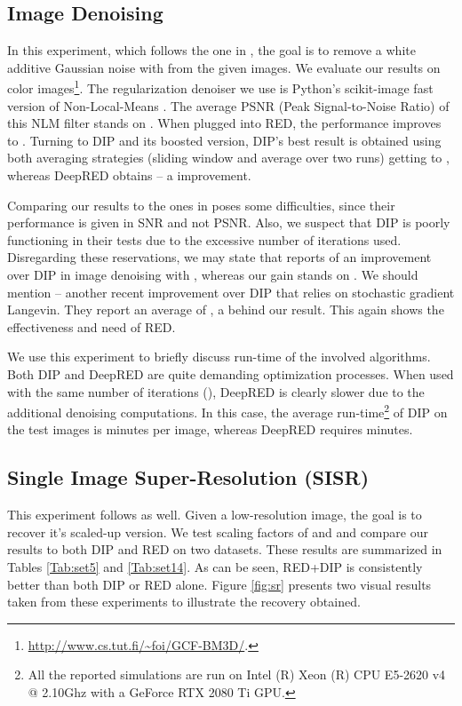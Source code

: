 \documentclass[12pt]{article}
\begin{document}
\subsection{Image Denoising}

In this experiment, which follows the one in \cite{DIP-2018}, the goal is to remove a white additive Gaussian noise with  from the given images. We evaluate our results on  color images\footnote{ \url{http://www.cs.tut.fi/~foi/GCF-BM3D/}.}. The regularization denoiser we use is Python's \textsf{scikit-image} fast version of Non-Local-Means \cite{NLM}. The average PSNR (Peak Signal-to-Noise Ratio) of this NLM filter stands on . When plugged into RED, the performance improves to . Turning to DIP and its boosted version, DIP's best result is obtained using both averaging strategies (sliding window and average over two runs) getting to , whereas DeepRED obtains  -- a  improvement. 

Comparing our results to the ones in \cite{DIP-TV} poses some difficulties, since their performance is given in SNR and not PSNR.
Also, we suspect that DIP is poorly functioning in their tests due to the excessive number of iterations used. 
Disregarding these reservations, we may state that \cite{DIP-TV} reports of an  improvement over DIP in image denoising with , whereas our gain stands on . We should mention \cite{cheng2019bayesian} -- another recent improvement over DIP that relies on stochastic gradient Langevin. They report an average of , a  behind our result. This again shows the effectiveness and need of RED. 

We use this experiment to briefly discuss run-time of the involved algorithms. Both DIP and DeepRED are quite demanding optimization processes. When used with the same number of iterations (), DeepRED is clearly slower due to the additional denoising computations. In this case, the average run-time\footnote{All the reported simulations are run on Intel (R) Xeon (R) CPU E5-2620 v4 @ 2.10Ghz with a GeForce RTX 2080 Ti GPU.} of DIP on the  test images is  minutes per image, whereas DeepRED requires  minutes. 



\subsection{Single Image Super-Resolution (SISR)}

This experiment follows \cite{DIP-2018} as well. Given a low-resolution image, the goal is to recover it's scaled-up version. We test scaling factors of  and  and compare our results to both DIP \cite{DIP-2018} and RED \cite{RED-2017} on two datasets. These results are summarized in Tables \ref{Tab:set5} and \ref{Tab:set14}. As can be seen, RED+DIP is consistently better than both DIP or RED alone. Figure \ref{fig:sr} presents two visual results taken from these experiments to illustrate the recovery obtained. 
\end{document}
